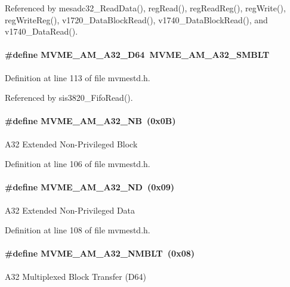 Referenced by mesadc32\_\-ReadData(), regRead(), regReadReg(), regWrite(), regWriteReg(), v1720\_\-DataBlockRead(), v1740\_\-DataBlockRead(), and v1740\_\-DataRead().
\paragraph[{MVME\_\-AM\_\-A32\_\-D64}]{\setlength{\rightskip}{0pt plus 5cm}\#define MVME\_\-AM\_\-A32\_\-D64~MVME\_\-AM\_\-A32\_\-SMBLT}\hfill\label{group__mvmestdinclude_ga7ef374bd677d3af92a18658a9045aed4}


Definition at line 113 of file mvmestd.h.

Referenced by sis3820\_\-FifoRead().
\paragraph[{MVME\_\-AM\_\-A32\_\-NB}]{\setlength{\rightskip}{0pt plus 5cm}\#define MVME\_\-AM\_\-A32\_\-NB~(0x0B)}\hfill\label{group__mvmestdinclude_ga89dedae70a7277e2091f7a7f66d28a01}
A32 Extended Non-\/Privileged Block 

Definition at line 106 of file mvmestd.h.
\paragraph[{MVME\_\-AM\_\-A32\_\-ND}]{\setlength{\rightskip}{0pt plus 5cm}\#define MVME\_\-AM\_\-A32\_\-ND~(0x09)}\hfill\label{group__mvmestdinclude_gafc80e688bd7646b4e6a52a49ab42d9b9}
A32 Extended Non-\/Privileged Data 

Definition at line 108 of file mvmestd.h.
\paragraph[{MVME\_\-AM\_\-A32\_\-NMBLT}]{\setlength{\rightskip}{0pt plus 5cm}\#define MVME\_\-AM\_\-A32\_\-NMBLT~(0x08)}\hfill\label{group__mvmestdinclude_ga4a2020bb04f39a29cca6e3dc07615664}
A32 Multiplexed Block Transfer (D64) 

